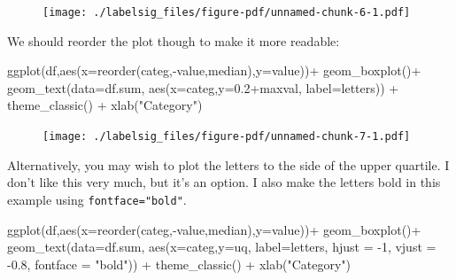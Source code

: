 \documentclass[
  letterpaper,
  DIV=11,
  numbers=noendperiod]{scrreprt}
\newenvironment{Shaded}{\begin{snugshade}}{\end{snugshade}}
\newcommand{\AttributeTok}[1]{\textcolor[rgb]{0.40,0.45,0.13}{#1}}
\newcommand{\DecValTok}[1]{\textcolor[rgb]{0.68,0.00,0.00}{#1}}
\newcommand{\FloatTok}[1]{\textcolor[rgb]{0.68,0.00,0.00}{#1}}
\newcommand{\FunctionTok}[1]{\textcolor[rgb]{0.28,0.35,0.67}{#1}}
\newcommand{\NormalTok}[1]{\textcolor[rgb]{0.00,0.23,0.31}{#1}}
\newcommand{\SpecialCharTok}[1]{\textcolor[rgb]{0.37,0.37,0.37}{#1}}
\newcommand{\StringTok}[1]{\textcolor[rgb]{0.13,0.47,0.30}{#1}}
\begin{document}
\begin{figure}[H]

{\centering \texttt{[image: ./labelsig\_files/figure-pdf/unnamed-chunk-6-1.pdf]}

}

\end{figure}

We should reorder the plot though to make it more readable:

\begin{Shaded}
\begin{Highlighting}[]
\FunctionTok{ggplot}\NormalTok{(df,}\FunctionTok{aes}\NormalTok{(}\AttributeTok{x=}\FunctionTok{reorder}\NormalTok{(categ,}\SpecialCharTok{{-}}\NormalTok{value,median),}\AttributeTok{y=}\NormalTok{value))}\SpecialCharTok{+}
  \FunctionTok{geom\_boxplot}\NormalTok{()}\SpecialCharTok{+}
  \FunctionTok{geom\_text}\NormalTok{(}\AttributeTok{data=}\NormalTok{df.sum,}
            \FunctionTok{aes}\NormalTok{(}\AttributeTok{x=}\NormalTok{categ,}\AttributeTok{y=}\FloatTok{0.2}\SpecialCharTok{+}\NormalTok{maxval,}
                \AttributeTok{label=}\NormalTok{letters)) }\SpecialCharTok{+}
  \FunctionTok{theme\_classic}\NormalTok{() }\SpecialCharTok{+}
  \FunctionTok{xlab}\NormalTok{(}\StringTok{"Category"}\NormalTok{)}
\end{Highlighting}
\end{Shaded}

\begin{figure}[H]

{\centering \texttt{[image: ./labelsig\_files/figure-pdf/unnamed-chunk-7-1.pdf]}

}

\end{figure}

Alternatively, you may wish to plot the letters to the side of the upper
quartile. I don't like this very much, but it's an option. I also make
the letters bold in this example using \texttt{fontface="bold"}.

\begin{Shaded}
\begin{Highlighting}[]
\FunctionTok{ggplot}\NormalTok{(df,}\FunctionTok{aes}\NormalTok{(}\AttributeTok{x=}\FunctionTok{reorder}\NormalTok{(categ,}\SpecialCharTok{{-}}\NormalTok{value,median),}\AttributeTok{y=}\NormalTok{value))}\SpecialCharTok{+}
  \FunctionTok{geom\_boxplot}\NormalTok{()}\SpecialCharTok{+}
  \FunctionTok{geom\_text}\NormalTok{(}\AttributeTok{data=}\NormalTok{df.sum,}
            \FunctionTok{aes}\NormalTok{(}\AttributeTok{x=}\NormalTok{categ,}\AttributeTok{y=}\NormalTok{uq,}
                \AttributeTok{label=}\NormalTok{letters,}
                \AttributeTok{hjust =} \SpecialCharTok{{-}}\DecValTok{1}\NormalTok{, }
                \AttributeTok{vjust =} \SpecialCharTok{{-}}\FloatTok{0.8}\NormalTok{, }
                \AttributeTok{fontface =} \StringTok{"bold"}\NormalTok{)) }\SpecialCharTok{+}
  \FunctionTok{theme\_classic}\NormalTok{() }\SpecialCharTok{+}
  \FunctionTok{xlab}\NormalTok{(}\StringTok{"Category"}\NormalTok{)}
\end{Highlighting}
\end{Shaded}
\end{document}
